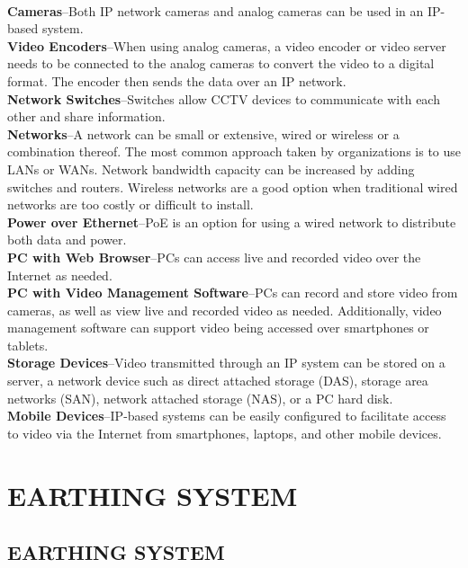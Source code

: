 \documentclass[12pt,fleqn]{book} %
\begin{document}
\begin{itemize}
\begin{enumerate}
        \\ \textbf{Cameras}–Both IP network cameras and analog cameras can be used in an IP-based system. 
\\\textbf{Video Encoders}–When using analog cameras, a video encoder or video server needs to be connected to the analog cameras to convert the video to a digital format. The encoder then sends the data over an IP network. 
\\\textbf{Network Switches}–Switches allow CCTV devices to communicate with each other and share information.
 \\\textbf{Networks}–A network can be small or extensive, wired or wireless or a combination thereof. The most common approach taken by organizations is to use LANs or WANs. Network bandwidth capacity can be increased by adding switches and routers. Wireless networks are a good option when traditional wired networks are too costly or difficult to install. 
\\\textbf{Power over Ethernet}–PoE is an option for using a wired network to distribute both data and power. 
\\\textbf{PC with Web Browser}–PCs can access live and recorded video over the Internet as needed.
\\\textbf{PC with Video Management Software}–PCs can record and store video from cameras, as well as view live and recorded video as needed. Additionally, video management software can support video being accessed over smartphones or tablets. 
\\\textbf{Storage Devices}–Video transmitted through an IP system can be stored on a server, a network device such as direct attached storage (DAS), storage area networks (SAN), network attached storage (NAS), or a PC hard disk. 
 \\\textbf{Mobile Devices}–IP-based systems can be easily configured to facilitate access to video via the Internet from smartphones, laptops, and other mobile devices.

    \end{enumerate}
\end{itemize}
\part{EARTHING SYSTEM}
\chapter{EARTHING SYSTEM}
\end{document}
